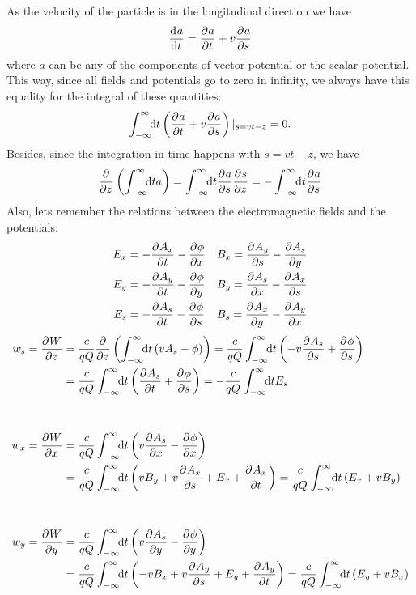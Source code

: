 \documentclass[
	12pt,				%
	openright,			%
	oneside,			%
	a4paper,		%
	chapter=TITLE,		%
	section=TITLE,		%
    brazil,				%
	english,			%
	sumario=tradicional,
	]{abntex2}
\begin{document}
\begin{apendicesenv}
As the velocity of the particle is in the longitudinal direction we have
\begin{align}
    \frac{\mathrm{d}^{{}}a}{\mathrm{d} t^{{}}} = \frac{\partial^{{}}a}{\partial t^{{}}} + v\frac{\partial^{{}}a}{\partial s^{{}}}
\end{align}
where $a$ can be any of the components of vector potential or the scalar potential. This way, since all fields and potentials go to zero in infinity, we always have this equality for the integral of these quantities:
\begin{align}
    \int_{-\infty}^{\infty}\!\!\text{d}t \left(\frac{\partial^{{}}a}{\partial t^{{}}} + v\frac{\partial^{{}}a}{\partial s^{{}}}\right)|_{s=vt-z} = 0.
\end{align}
Besides, since the integration in time happens with $s=vt-z$, we have
\begin{align}
    \frac{\partial^{{}}}{\partial z^{{}}}\left(\int_{-\infty}^{\infty}\!\!\text{d}t a\right) =
    \int_{-\infty}^{\infty}\!\!\text{d}t \frac{\partial^{{}}a}{\partial s^{{}}}\frac{\partial^{{}}s}{\partial z^{{}}} =
    -\int_{-\infty}^{\infty}\!\!\text{d}t \frac{\partial^{{}}a}{\partial s^{{}}}
\end{align}
Also, lets remember the relations between the electromagnetic fields and the potentials:
\begin{align}
    E_x &= -\frac{\partial^{{}}A_x}{\partial t^{{}}} - \frac{\partial^{{}}\phi}{\partial x^{{}}} &
        & B_x = \frac{\partial^{{}}A_y}{\partial s^{{}}} - \frac{\partial^{{}}A_s}{\partial y^{{}}}\\
    E_y &= -\frac{\partial^{{}}A_y}{\partial t^{{}}} - \frac{\partial^{{}}\phi}{\partial y^{{}}} &
        & B_y = \frac{\partial^{{}}A_s}{\partial x^{{}}} - \frac{\partial^{{}}A_x}{\partial s^{{}}}\\
    E_s &= -\frac{\partial^{{}}A_s}{\partial t^{{}}} - \frac{\partial^{{}}\phi}{\partial s^{{}}} &
        & B_s = \frac{\partial^{{}}A_x}{\partial y^{{}}} - \frac{\partial^{{}}A_y}{\partial x^{{}}}
\end{align}
\begin{align}
    w_s = \derpar{W}{z}\nonumber
    &= \frac{c}{qQ} \derpar{}{z}\left(\infint{t}{\left(vA_s-\phi\right)}\right)
    = \frac{c}{qQ} \infint{t}{\left(-v\derpar{A_s}{s}+\derpar{\phi}{s}\right)}\\
    &= \frac{c}{qQ} \infint{t}{\left(\derpar{A_s}{t}+\derpar{\phi}{s}\right)}
    =-\frac{c}{qQ} \infint{t}{E_s}\\[1cm]
    w_x = \derpar{W}{x}\nonumber
    &=\frac{c}{qQ} \infint{t}{\left(v\derpar{A_s}{x}-\derpar{\phi}{x}\right)}\\
    &= \frac{c}{qQ} \infint{t}{\left(vB_y+v\derpar{A_x}{s} + E_x + \derpar{A_x}{t}\right)}
    = \frac{c}{qQ} \infint{t}{\left(E_x + vB_y\right)}\\[1cm]
    w_y = \derpar{W}{y}\nonumber
    &=\frac{c}{qQ} \infint{t}{\left(v\derpar{A_s}{y}-\derpar{\phi}{y}\right)}\\
    &=\frac{c}{qQ} \infint{t}{\left(-vB_x+v\derpar{A_y}{s} + E_y + \derpar{A_y}{t}\right)}
    = \frac{c}{qQ} \infint{t}{\left(E_y + vB_x\right)}
\end{align}




\end{apendicesenv}
\end{document}
